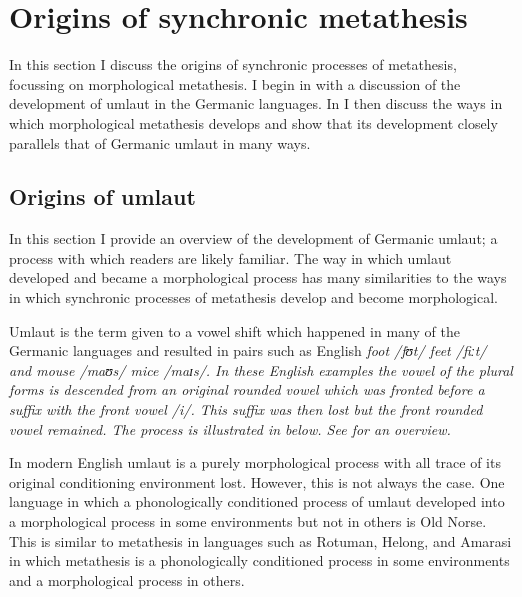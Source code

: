 \section{Origins of synchronic metathesis}\label{sec:OriSynMet}
In this section I discuss the origins of synchronic
processes of metathesis, focussing on morphological metathesis.
I begin in  with a discussion of the development
of umlaut in the Germanic languages.
In  I then discuss the ways in which morphological metathesis
develops and show that its development closely parallels that of Germanic umlaut in many ways.

\subsection{Origins of umlaut}\label{sec:OriUml}
In this section I provide an overview of the development of Germanic umlaut;
a process with which readers are likely familiar.
The way in which umlaut developed and became a morphological
process has many similarities to the ways in which
synchronic processes of metathesis develop and become morphological.

Umlaut is the term given to a vowel shift which happened in
many of the Germanic languages and resulted in pairs such as
English \it{foot} /fʊt/ {\tl} \it{feet} /fiːt/
and \it{mouse} /maʊs/ {\tl} \it{mice} /maɪs/.
In these English examples the vowel of the plural forms
is descended from an original rounded vowel which was
fronted before a suffix with the front vowel /i/.
This suffix was then lost but the front rounded vowel remained.
The process is illustrated in  below.
See \citet[58ff]{ha07} for an overview.

\begin{exe}\let\eachwordone=\textnormal
	\label{ex:mu:s-2}
\end{exe}

In modern English umlaut is a purely morphological process
with all trace of its original conditioning environment lost.
However, this is not always the case.
One language in which a phonologically
conditioned process of umlaut developed into a morphological process
in some environments but not in others is Old Norse.
This is similar to metathesis in languages such as Rotuman, Helong,
and Amarasi in which metathesis is a phonologically conditioned process
in some environments and a morphological process in others.

